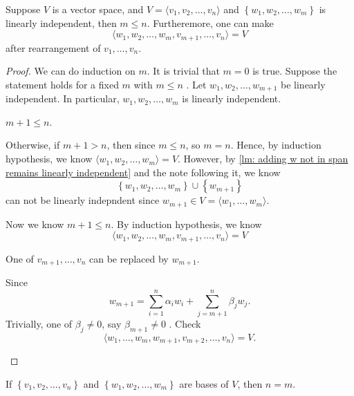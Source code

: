 \begin{theorem} \label{thm: sizeof(linearly ind.) less than sizeof(bases) and extend basis}
    Suppose \(V\) is a vector space, and \(V = \langle v_1, v_2, \dots , v_n \rangle \)  and \(\left\{ w_1, w_2, \dots , w_m \right\} \) is linearly independent, then \(m \le n\). Furtheremore, one can make 
    \[
        \langle w_1, w_2, \dots , w_m, v_{m+1}, \dots , v_n \rangle = V 
    \] after rearrangement of \(v_1, \dots , v_n\). 
\end{theorem}
\begin{proof}
    We can do induction on \(m\). It is trivial that \(m=0\) is true. Suppose the statement holds for a fixed \(m\) with \(m \le n\) . Let \(w_1, w_2, \dots , w_{m+1}\) be linearly independent.  In particular, \(w_1, w_2, \dots , w_m\) is linearly independent. 
    \begin{claim}
        \(m+1 \le n\). 
    \end{claim} 
    \begin{explanation}
        Otherwise, if \(m+1 > n\), then since \(m \le n\), so \(m = n\). Hence, by induction hypothesis, we know \(\langle w_1, w_2, \dots , w_m \rangle = V \). However, by \autoref{lm: adding w not in span remains linearly independent} and the note following it, we know 
        \[
            \left\{ w_1, w_2, \dots , w_m \right\} \cup \left\{ w_{m+1} \right\}  
        \] can not be linearly indepndent since \(w_{m+1} \in V = \langle w_1, \dots , w_m \rangle \).
    \end{explanation}

    Now we know \(m+1 \le n\). By induction hypothesis, we know 
    \[
        \langle w_1, w_2, \dots , w_m, v_{m+1}, \dots , v_n \rangle = V
    \] 
    \begin{claim}
        One of \(v_{m+1}, \dots , v_n\) can be replaced by \(w_{m+1}\).  
    \end{claim}
    \begin{explanation}
        Since 
        \[
            w_{m+1} = \sum_{i=1}^n \alpha _i w_i + \sum_{j=m+1}^n \beta _j w_j.  
        \]
        Trivially, one of \(\beta _j \neq 0\), say \(\beta _{m+1} \neq 0\) . Check 
        \[
            \langle w_1, \dots , w_m, w_{m+1}, v_{m+2}, \dots , v_n  \rangle = V.
        \] 
    \end{explanation}
\end{proof}

\begin{corollary} \label{cl: basis size unique}
    If \(\left\{ v_1, v_2, \dots , v_n \right\} \) and \(\left\{ w_1, w_2, \dots , w_m \right\} \) are bases of \(V\), then \(n = m\).    
\end{corollary}

